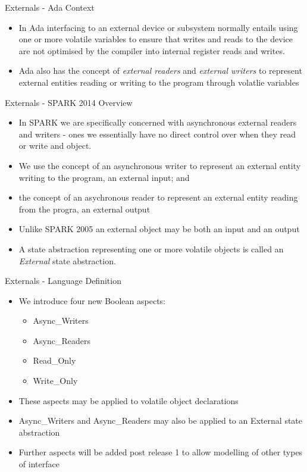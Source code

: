 \documentclass{beamer}
\begin{document}
\begin{frame}{Externals - Ada Context}

  \begin{itemize}
  \item In Ada interfacing to an external device or subsystem normally
    entails using one or more volatile variables to ensure that writes
    and reads to the device are not optimised by the compiler into
    internal register reads and writes.
  \item Ada also has the concept of \emph {external readers} and \emph
    {external writers} to represent external entities reading or
    writing to the program through volatlie variables
  \end{itemize}
 
\end{frame}

\begin{frame}{Externals - SPARK 2014 Overview}

  \begin{itemize}
 \item In SPARK we are specifically concerned with asynchronous
   external readers and writers - ones we essentially have no direct
   control over when they read or write and object.
  \item We use the concept of an asynchronous writer to represent an
    external entity writing to the program, an external input; and
 \item the concept of an asychronous reader to represent an external
   entity reading from the progra, an external output
 \item Unlike SPARK 2005 an external object may be both an input and
   an output
 \item A state abstraction representing one or more volatile objects
   is called an \emph {External} state abstraction.  
  \end{itemize}
 
\end{frame}

\begin{frame}{Externals - Language Definition}

  \begin{itemize}
  \item We introduce four new Boolean aspects:
    \begin{itemize}
    \item Async\_Writers
    \item Async\_Readers
    \item Read\_Only
    \item Write\_Only
    \end{itemize}
  \item These aspects may be applied to volatile object declarations
  \item Async\_Writers and Async\_Readers may also be applied to an
    External state abstraction
  \item Further aspects will be added post release 1 to allow modelling of other types of interface
  \end{itemize}
 
\end{frame}
\end{document}
